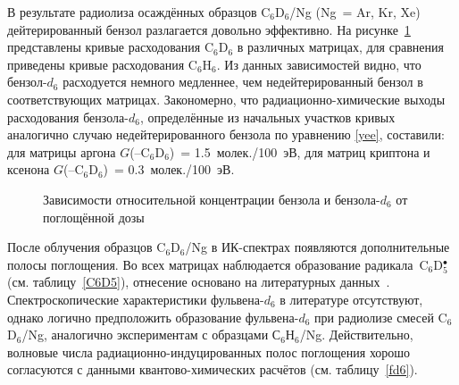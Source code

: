 {В результате радиолиза осаждённых образцов C$_6$D$_6$/Ng (Ng~= Ar, Kr, Xe) дейтерированный бензол разлагается довольно эффективно. На рисунке~\ref{comp} представлены кривые расходования C$_6$D$_6$ в различных матрицах, для сравнения приведены кривые расходования C$_6$H$_6$. Из данных зависимостей видно, что бензол\nobreakdash-$d_6$ расходуется немного медленнее, чем недейтерированный бензол в соответствующих матрицах. Закономерно, что радиационно-химические выходы расходования бензола-$d_6$, определённые из начальных участков кривых аналогично случаю недейтерированного бензола по уравнению \ref{yee}, составили: для матрицы аргона $G$(--C$_6$D$_6$)~= 1.5~молек./100~эВ, для матриц криптона и ксенона    $G$(--C$_6$D$_6$)~= 0.3~молек./100~эВ.


 \begin{figure}[H]
\caption{Зависимости относительной концентрации бензола и бензола-$d_6$ от поглощённой дозы}
\label{comp}
\end{figure}

После облучения образцов C$_6$D$_6$/Ng в ИК-спектрах появляются дополнительные полосы поглощения. Во всех матрицах наблюдается образование радикала~C$_6$D$_5^\bullet$ (см. таблицу~\ref{C6D5}), отнесение основано на литературных данных~\cite{Friderichsen2001}. Спектроскопические характеристики фульвена-$d_6$ в литературе отсутствуют, однако логично предположить образование фульвена-$d_6$ при радиолизе смесей C$_6$D$_6$/Ng, аналогично экспериментам с образцами С$_6$Н$_6$/Ng. Действительно, волновые числа радиационно-индуцированных полос поглощения хорошо согласуются с данными квантово-химических расчётов (см. таблицу~\ref{fd6}).

}
